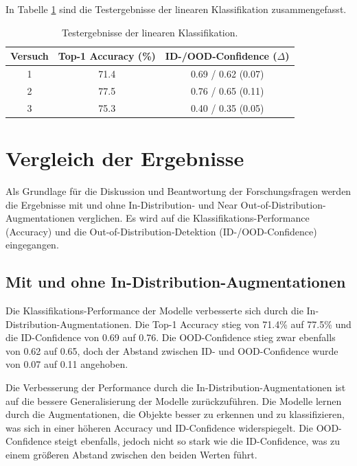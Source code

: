 In Tabelle \ref{tab:supcon-lin-results} sind die Testergebnisse der linearen Klassifikation zusammengefasst.

\begin{table}[h]
	\caption{Testergebnisse der linearen Klassifikation.}
	\begin{tabular}{|c|c|c|}
		\hline
		\textbf{Versuch} & \textbf{Top-1 Accuracy (\%)} & \textbf{ID-/OOD-Confidence ($\Delta$)} \\
		\hline
		1 & 71.4 & 0.69 / 0.62 (0.07) \\
		2 & 77.5 & 0.76 / 0.65 (0.11) \\
		3 & 75.3 & 0.40 / 0.35 (0.05) \\
		\hline
	\end{tabular}
	\label{tab:supcon-lin-results}
\end{table}

\section{Vergleich der Ergebnisse} \label{sec:results-comparison}

Als Grundlage für die Diskussion und Beantwortung der Forschungsfragen werden die Ergebnisse mit und ohne In-Distribution- und Near Out-of-Distribution-Augmentationen verglichen. Es wird auf die Klassifikations-Performance (Accuracy) und die Out-of-Distribution-Detektion (ID-/OOD-Confidence) eingegangen.

\subsection{Mit und ohne In-Distribution-Augmentationen} \label{sec:results-comparison-id}

Die Klassifikations-Performance der Modelle verbesserte sich durch die In-Distribution-Augmentationen. Die Top-1 Accuracy stieg von 71.4\% auf 77.5\% und die ID-Confidence von 0.69 auf 0.76. Die OOD-Confidence stieg zwar ebenfalls von 0.62 auf 0.65, doch der Abstand zwischen ID- und OOD-Confidence wurde von 0.07 auf 0.11 angehoben.

Die Verbesserung der Performance durch die In-Distribution-Augmentationen ist auf die bessere Generalisierung der Modelle zurückzuführen. Die Modelle lernen durch die Augmentationen, die Objekte besser zu erkennen und zu klassifizieren, was sich in einer höheren Accuracy und ID-Confidence widerspiegelt. Die OOD-Confidence steigt ebenfalls, jedoch nicht so stark wie die ID-Confidence, was zu einem größeren Abstand zwischen den beiden Werten führt.

